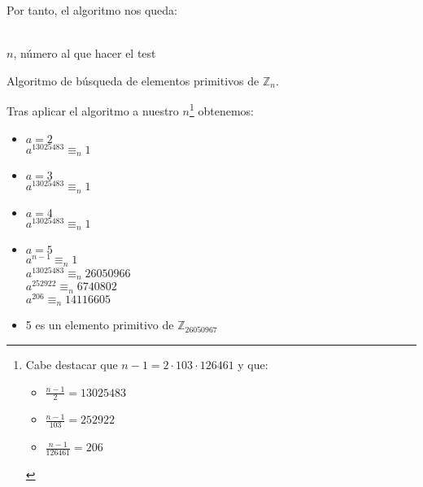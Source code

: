 \begin{enumerate}
		Por tanto, el algoritmo nos queda:
		\begin{algorithm}[H]
		\begin{algorithmic}[1]
			\REQUIRE \ \\
				\texttt{$n$}, número al que hacer el test \\
				\ELSE
						\ENDIF
					\ENDFOR
				\ENDIF
					\ENDFOR
				\ELSE
				\ENDIF
			\ENDWHILE
			\ENDIF
		\end{algorithmic}
		\caption{Algoritmo de búsqueda de elementos primitivos de $\mathbb{Z}_n$.}
		\label{Primitive}
		\end{algorithm}
		
		Tras aplicar el algoritmo a nuestro $n$\footnote{Cabe destacar que $n-1 = 2 \cdot 103 \cdot 126461$ y que:
		\begin{itemize}
			\item $\displaystyle \frac{n-1}{2} = 13025483$
			\item $\displaystyle \frac{n-1}{103} = 252922$
			\item $\displaystyle \frac{n-1}{126461} = 206$
		\end{itemize}} obtenemos:
		\begin{itemize}
			\item $a = 2$ \\
			$a^{13025483} \equiv_n  1$ \\
			
			\item $a = 3$ \\
			$a^{13025483} \equiv_n  1$ \\
			
			\item $a = 4$ \\
			$a^{13025483} \equiv_n  1$
			
			\item $a = 5$ \\
			$a^{n-1} \equiv_n 1$ \\
			$a^{13025483} \equiv_n 26050966$ \\
			$a^{252922} \equiv_n 6740802$ \\
			$a^{206} \equiv_n 14116605$ \\
			
			\item 5 es un elemento primitivo de $\mathbb{Z}_{26050967}$
		\end{itemize}
	\end{enumerate}
